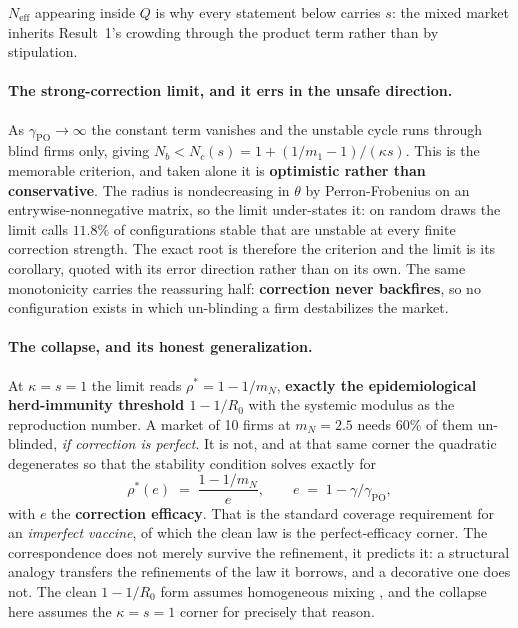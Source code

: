 \documentclass{article}
\theoremstyle{plain}
\theoremstyle{definition}
\newcommand{\Neff}{N_{\mathrm{eff}}}
\newcommand{\mN}{m_N}
\begin{document}
$\Neff$ appearing inside $Q$ is why every statement below carries $s$: the mixed market inherits Result~1's crowding through the product term rather than by stipulation.

\paragraph{The strong-correction limit, and it errs in the unsafe direction.}
As $\gamma_{\mathrm{PO}}\to\infty$ the constant term vanishes and the unstable cycle runs through blind firms only, giving $N_b < N_c(s) = 1 + (1/m_1 - 1)/(\kappa s)$. This is the memorable criterion, and taken alone it is \textbf{optimistic rather than conservative}. The radius is nondecreasing in $\theta$ by Perron-Frobenius on an entrywise-nonnegative matrix, so the limit under-states it: on random draws the limit calls $11.8\%$ of configurations stable that are unstable at every finite correction strength. The exact root is therefore the criterion and the limit is its corollary, quoted with its error direction rather than on its own. The same monotonicity carries the reassuring half: \textbf{correction never backfires}, so no configuration exists in which un-blinding a firm destabilizes the market.

\paragraph{The collapse, and its honest generalization.}
At $\kappa = s = 1$ the limit reads $\rho^{*} = 1 - 1/\mN$, \textbf{exactly the epidemiological herd-immunity threshold $1-1/R_0$} with the systemic modulus as the reproduction number. A market of 10 firms at $\mN = 2.5$ needs 60\% of them un-blinded, \emph{if correction is perfect}. It is not, and at that same corner the quadratic degenerates so that the stability condition solves exactly for
\begin{equation}
\rho^{*}(e) \;=\; \frac{1 - 1/\mN}{e}, \qquad e \;=\; 1 - \gamma/\gamma_{\mathrm{PO}},
\end{equation}
with $e$ the \textbf{correction efficacy}. That is the standard coverage requirement for an \emph{imperfect vaccine}, of which the clean law is the perfect-efficacy corner. The correspondence does not merely survive the refinement, it predicts it: a structural analogy transfers the refinements of the law it borrows, and a decorative one does not. The clean $1-1/R_0$ form assumes homogeneous mixing \citep{fine2011}, and the collapse here assumes the $\kappa=s=1$ corner for precisely that reason.
\end{document}
